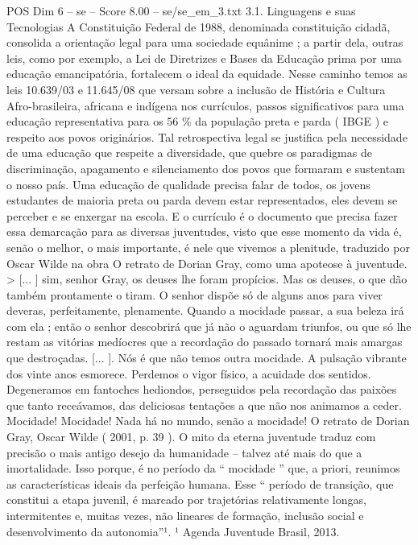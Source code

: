 \begin{textsample}{POS Dim 6 – se – Score 8.00 – se/se\_em\_3.txt}  \label{ex:f6_pos_045}
3.1.
Linguagens e suas Tecnologias A Constituição Federal de 1988, denominada constituição cidadã, consolida a orientação legal para uma sociedade equânime ; a partir dela, outras leis, como por exemplo, a Lei de Diretrizes e Bases da Educação prima por uma educação emancipatória, fortalecem o ideal da equidade.
Nesse caminho temos as leis 10.639/03 e 11.645/08 que versam sobre a inclusão de História e Cultura Afro-brasileira, africana e indígena nos currículos, passos significativos para uma educação representativa para os 56 \% da população preta e parda ( IBGE ) e respeito aos povos originários.
Tal retrospectiva legal se justifica pela necessidade de uma educação que respeite a diversidade, que quebre os paradigmas de discriminação, apagamento e silenciamento dos povos que formaram e sustentam o nosso país.
Uma educação de qualidade precisa falar de todos, os jovens estudantes de maioria preta ou parda devem estar representados, eles devem se perceber e se enxergar na escola.
E o currículo é o documento que precisa fazer essa demarcação para as diversas juventudes, visto que esse momento da vida é, senão o melhor, o mais importante, é nele que vivemos a plenitude, traduzido por Oscar Wilde na obra O retrato de Dorian Gray, como uma apoteose à juventude. > [... ] sim, senhor Gray, os deuses lhe foram propícios.
Mas os deuses, o que dão também prontamente o tiram.
O senhor dispõe só de alguns anos para viver deveras, perfeitamente, plenamente.
Quando a mocidade passar, a sua beleza irá com ela ; então o senhor descobrirá que já não o aguardam triunfos, ou que só lhe restam as vitórias medíocres que a recordação do passado tornará mais amargas que destroçadas. [... ].
Nós é que não temos outra mocidade.
A pulsação vibrante dos vinte anos esmorece.
Perdemos o vigor físico, a acuidade dos sentidos.
Degeneramos em fantoches hediondos, perseguidos pela recordação das paixões que tanto receávamos, das deliciosas tentações a que não nos animamos a ceder.
Mocidade!
Mocidade!
Nada há no mundo, senão a mocidade!
O retrato de Dorian Gray, Oscar Wilde ( 2001, p. 39 ).
O mito da eterna juventude traduz com precisão o mais antigo desejo da humanidade – talvez até mais do que a imortalidade.
Isso porque, é no período da “ mocidade ” que, a priori, reunimos as características ideais da perfeição humana.
Esse “ período de transição, que constitui a etapa juvenil, é marcado por trajetórias relativamente longas, intermitentes e, muitas vezes, não lineares de formação, inclusão social e desenvolvimento da autonomia”¹. ¹ Agenda Juventude Brasil, 2013.

\end{textsample}
